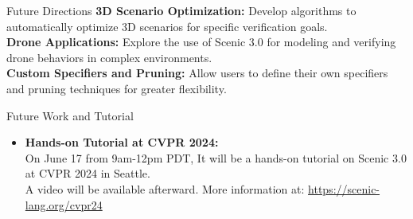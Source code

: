 \documentclass[10pt]{beamer}
\begin{document}
\begin{frame}{Future Directions}
    \textbf{3D Scenario Optimization:} Develop algorithms to automatically optimize 3D scenarios for specific verification goals.\\
    \textbf{Drone Applications:} Explore the use of Scenic 3.0 for modeling and verifying drone behaviors in complex environments.\\
    \textbf{Custom Specifiers and Pruning:} Allow users to define their own specifiers and pruning techniques for greater flexibility.
\end{frame}

\begin{frame}{Future Work and Tutorial}
    \begin{itemize}
        \item \textbf{Hands-on Tutorial at CVPR 2024:}\\ On June 17 from 9am-12pm PDT, It will be a hands-on tutorial on Scenic 3.0 at CVPR 2024 in Seattle. \\
        A video will be available afterward. More information at: \url{https://scenic-lang.org/cvpr24} 
    \end{itemize}
\end{frame}
\end{document}
